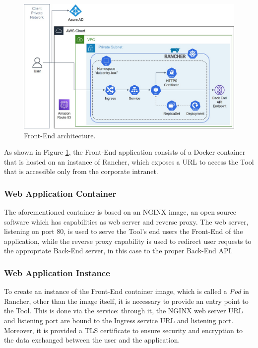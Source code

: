 \begin{figure}[!htb]
    \centering
    \includegraphics[width=15.8cm]{chapters/images/ch_3/FE.jpg}
    \caption{Front-End architecture.}
    \label{fig:FE}
\end{figure}
As shown in Figure \ref{fig:FE}, the Front-End application consists of a Docker container that is hosted on an instance of Rancher, which exposes a URL to access the Tool that is accessible only from the corporate intranet.

\subsubsection{Web Application Container}
The aforementioned container is based on an NGINX \cite{nginx} image, an open source software which has capabilities as web server and reverse proxy. The web server, listening on port 80, is used to serve the Tool's end users the Front-End of the application, while the reverse proxy capability is used to redirect user requests to the appropriate Back-End server, in this case to the proper Back-End API.


\subsubsection{Web Application Instance}
To create an instance of the Front-End container image, which is called a \emph{Pod} in Rancher, other than the image itself, it is necessary to provide an entry point to the Tool. This is done via the  service: through it, the NGINX web server URL and listening port are bound to the Ingress service URL and listening port. Moreover, it is provided a TLS certificate to ensure security and encryption to the data exchanged between the user and the application.


